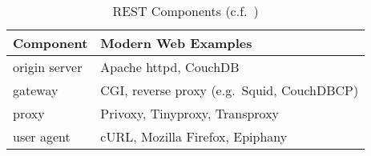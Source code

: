 \begin{table}[h]\small
\begin{tabular}{l l}
\toprule[0.15em]
    {\bf Component}
    &{\bf Modern Web Examples}
\\\midrule[0.15em]
    {origin server}
    &{Apache httpd, CouchDB}
\\\midrule
    {gateway}
    &{CGI, reverse proxy (e.g.\ Squid, CouchDBCP)}
\\\midrule
    {proxy}
    &{Privoxy, Tinyproxy, Transproxy}
\\\midrule
    {user agent}
    &{cURL, Mozilla Firefox, Epiphany}
\\\bottomrule[0.1em]
\end{tabular}
\centering
\caption{REST Components (c.f.\ \cite[p.~96]{Fie00})}
\label{REST_Components}
\end{table}
